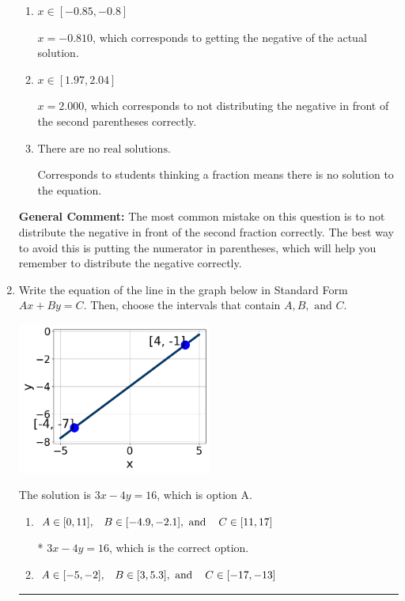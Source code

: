 \documentclass{extbook}[14pt]
\newcommand{\litem}[1]{\item #1

\rule{\textwidth}{0.4pt}}
\begin{document}
\begin{enumerate}
{\begin{enumerate}[label=\Alph*.]
$x = -2.000$, which corresponds to not distributing the negative in front of the first parentheses correctly.
\item \( x \in [-0.85, -0.8] \)

$x = -0.810$, which corresponds to getting the negative of the actual solution.
\item \( x \in [1.97, 2.04] \)

$x = 2.000$, which corresponds to not distributing the negative in front of the second parentheses correctly.
\item \( \text{There are no real solutions.} \)

Corresponds to students thinking a fraction means there is no solution to the equation.
\end{enumerate}

\textbf{General Comment:} The most common mistake on this question is to not distribute the negative in front of the second fraction correctly. The best way to avoid this is putting the numerator in parentheses, which will help you remember to distribute the negative correctly.
}
\litem{
Write the equation of the line in the graph below in Standard Form $Ax+By=C$. Then, choose the intervals that contain $A, B, \text{ and } C$.

\begin{center}
    \includegraphics[width=0.5\textwidth]{../Figures/linearGraphToStandardCopyB.png}
\end{center}


The solution is \( 3x - 4y = 16 \), which is option A.\begin{enumerate}[label=\Alph*.]
\item \( A \in [0, 11], \hspace{3mm} B \in [-4.9, -2.1], \text{ and } \hspace{3mm} C \in [11, 17] \)

* $3x - 4y = 16$, which is the correct option.
\item \( A \in [-5, -2], \hspace{3mm} B \in [3, 5.3], \text{ and } \hspace{3mm} C \in [-17, -13] \)


\end{enumerate}}
\end{enumerate}
\end{document}
